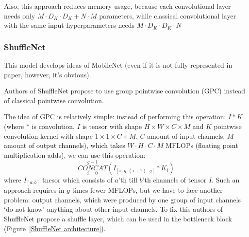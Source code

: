 Also, this approach reduces memory usage, because each convolutional layer needs
only $M \cdot D_K\cdot D_K + N\cdot M$ parameters, while classical convolutional layer
with the same input hyperparameters needs $M \cdot D_K\cdot D_K \cdot N$

\subsubsection{ShuffleNet}

This model develops ideas of MobileNet (even if it is not fully represented in paper, however, it's obvious).

Authors of ShuffleNet propose to use group pointwise convolution (GPC) instead of 
classical pointwise convolution\cite{shufflenet}. 

The idea of GPC is relatively simple: instead of performing this operation:
$I * K$ (where $*$ is convolution, $I$ is tensor with shape $H\times W \times C \times M$ 
and $K$ pointwise convolution kernel with shape $1\times 1 \times C \times M$, 
$C$ \- amount of input channels, $M$ \- amount of output channels), which
takes $W\cdot H \cdot C \cdot M$ MFLOPs (floating point multiplication-adds), we 
can use this operation:
\[\overset{g-1}{\underset{i=0}{CONCAT}}(I_{[i\cdot g : (i+1)\cdot g]}* K_i)\] 
where $I_{[a:b]}$ \- tnesor which consists of $a$'th till $b$'th channels of tensor $I$. 
Such an approach requires in $g$ times fewer MFLOPs, but we have to face another problem:
output channels, which were produced by one group of input channels `do not know' anything about 
other input channels. To fix this authors of ShuffleNet propose a shuffle layer, which
can be used in the bottleneck block (Figure~\ref{ShuffleNet architecture}).
